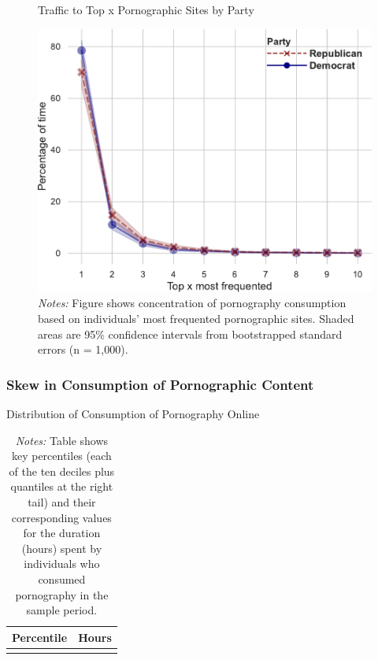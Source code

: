 \documentclass[12pt, letterpaper]{article}
\begin{document}
\begin{figure}
	\centering
	\caption{Traffic to Top x Pornographic Sites by Party}
	\includegraphics[width=.6\textwidth]{../figs/concentration_porn_consumption_topX_by_party.pdf}
	\caption*{\footnotesize \emph{Notes:} 
		Figure shows concentration of pornography consumption based on individuals' most frequented pornographic sites.
		Shaded areas are 95\% confidence intervals from bootstrapped standard errors (n = 1,000).
	}
	\label{fig:concentration_porn_consumption_topX_by_party}
\end{figure}


\FloatBarrier
\subsubsection{Skew in Consumption of Pornographic Content}
\begin{table}[ht] \centering \small \setlength\tabcolsep{10 pt}
	\caption{Distribution of Consumption of Pornography Online}
	\label{tab:distribution_duration}
	\begin{adjustbox}{max width=\textwidth}
		\begin{tabular}{cr}
			\toprule
			\multicolumn{1}{c}{\textbf{Percentile}}&\multicolumn{1}{c}{\textbf{Hours}}\\
			\midrule
			\\
			\bottomrule
		\end{tabular}
	\end{adjustbox}
	\caption*{\footnotesize \emph{Notes:} 
		Table shows key percentiles (each of the ten deciles plus quantiles at the right tail) and their corresponding values for the duration (hours) spent by individuals who consumed pornography in the sample period. 
	}
\end{table}
\end{document}
